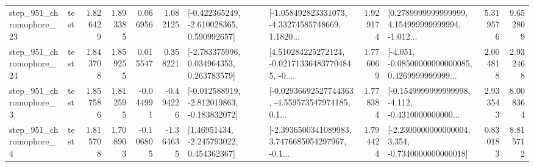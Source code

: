 \begin{tabular}{llrrrrllrlrr}
  step\_951\_chromophore\_23 &      test &      1.826429 &    1.893385 &      0.066956 &  1.082125 &   [-0.422365249, -2.610028365, 0.590992657] &  [-1.058492823331073, -4.33274585748669, 1.1820... &       1.929174 &  [0.2789999999999999, 4.154999999999994, -1.012... &            5.319576 &          9.652809 \\
  step\_951\_chromophore\_24 &      test &      1.843708 &    1.859255 &      0.015547 &  0.358221 &    [-2.783375996, 0.034964353, 0.263783579] &  [4.510284225272124, -0.021713364837704845, -0.... &       1.776069 &  [-4.051, -0.08500000000000085, 0.4269999999999... &            2.004818 &          2.932468 \\
   step\_951\_chromophore\_3 &      test &      1.857586 &    1.812595 &     -0.044991 & -0.494226 &  [-0.012588919, -2.812019863, -0.183832072] &  [-0.02936692527744363, -4.559573547974185, 0.1... &       1.778384 &  [-0.1549999999999998, -4.112, -0.4310000000000... &            2.933543 &          8.008364 \\
   step\_951\_chromophore\_4 &      test &      1.815708 &    1.708903 &     -0.106805 & -1.364635 &     [1.46951434, -2.245793022, 0.454362367] &  [-2.3936500341089983, 3.7476685054297967, -0.1... &       1.794424 &  [-2.2300000000000004, 3.354, -0.7340000000000018] &            0.830183 &          8.815712 \\
\bottomrule
\end{tabular}

